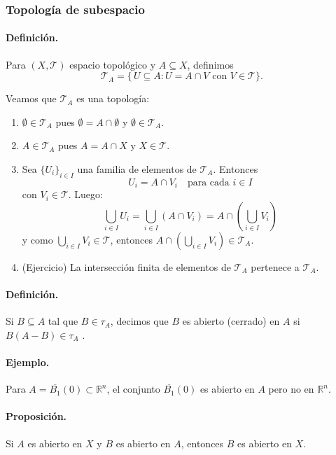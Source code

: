 \subsubsection{Topología de subespacio}

\paragraph{\textbf{Definición.}}
Para $(X,\mathcal T)$ espacio topológico y $A\subseteq X$, definimos
\[
  \mathcal T_{A} = \{\,U\subseteq A: U=A\cap V\text{ con }V\in\mathcal T\}.
\]

Veamos que $\mathcal T_A$ es una topología:

\begin{enumerate}
\item $\emptyset \in \mathcal T_A$ pues $\emptyset = A \cap \emptyset$ y $\emptyset \in \mathcal T_A$.
\item $A \in \mathcal T_A$ pues $A = A \cap X$ y $X \in \mathcal T$.
\item Sea $\{U_i\}_{i \in I}$ una familia de elementos de $\mathcal T_A$. Entonces
\[
U_i = A \cap V_i \quad \text{para cada } i \in I
\]
con $V_i \in \mathcal T$. Luego:
\[
\bigcup_{i \in I} U_i = \bigcup_{i \in I} (A \cap V_i) = A \cap \left(\bigcup_{i \in I} V_i\right)
\]
y como $\bigcup_{i \in I} V_i \in \mathcal T$, entonces $A \cap \left(\bigcup_{i \in I} V_i\right) \in \mathcal T_A$.
\item (Ejercicio) La intersección finita de elementos de $\mathcal T_A$ pertenece a $\mathcal T_A$.
\end{enumerate}

\paragraph{\textbf{Definición.}} Si $B\subseteq A$ tal que $B \in \tau_A$, decimos que $B$ es abierto (cerrado) en $A$  si $B (A-B) \in \tau_A$  .


\paragraph{\textbf{Ejemplo.}}
Para $A=\overline{B_{1}}(0)\subset\mathbb{R}^{n}$, el conjunto
$\overline{B_{1}}(0)$ es abierto en $A$ pero no en $\mathbb{R}^{n}$.

\paragraph{\textbf{Proposición.}}
Si $A$ es abierto en $X$ y $B$ es abierto en $A$, entonces $B$ es abierto en $X$.


